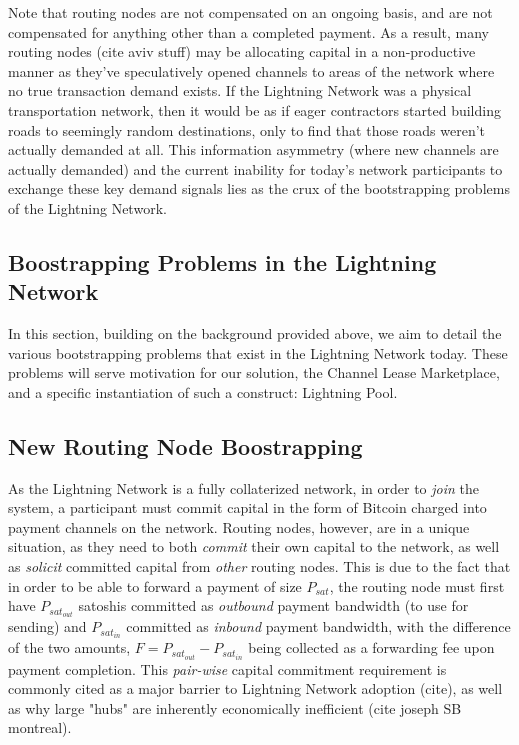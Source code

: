 \documentclass[10pt,a4paper]{article}
\theoremstyle{definition}
\begin{document}
 Note that routing nodes are not compensated on an ongoing basis, and are not
 compensated for anything other than a completed payment. As a result, many
 routing nodes (cite aviv stuff) may be allocating capital in a non-productive
 manner as they've speculatively opened channels to areas of the network where
 no true transaction demand exists. If the Lightning Network was a physical
 transportation network, then it would be as if eager contractors started
 building roads to seemingly random destinations, only to find that those roads
 weren't actually demanded at all. This information asymmetry (where new
 channels are actually demanded) and the current inability for today's network
 participants to exchange these key demand signals lies as the crux of the
 bootstrapping problems of the Lightning Network. 


\subsection{Boostrapping Problems in the Lightning Network}

In this section, building on the background provided above, we aim to detail
the various bootstrapping problems that exist in the Lightning Network today.
These problems will serve motivation for our solution, the Channel Lease
Marketplace, and a specific instantiation of such a construct: Lightning Pool. 


\subsection{New Routing Node Boostrapping}

As the Lightning Network is a fully collaterized network, in order to
\emph{join} the system, a participant must commit capital in the form of
Bitcoin charged into payment channels on the network. Routing nodes, however, are
in a unique situation, as they need to both \emph{commit} their own capital to
the network, as well as \emph{solicit} committed capital from \emph{other}
routing nodes. This is due to the fact that in order to be able to forward a
payment of size $P_{sat}$, the routing node must first have $P_{sat_{out}}$
satoshis committed as \emph{outbound} payment bandwidth (to use for sending)
and $P_{sat_{in}}$ committed as \emph{inbound} payment bandwidth, with the
difference of the two amounts, $F= P_{sat_{out}} -  P_{sat_{in}}$ being collected
as a forwarding fee upon payment completion. This \emph{pair-wise} capital
commitment requirement is commonly cited as a major barrier to Lightning
Network adoption (cite), as well as why large "hubs" are inherently
economically inefficient (cite joseph SB montreal). 
\end{document}

